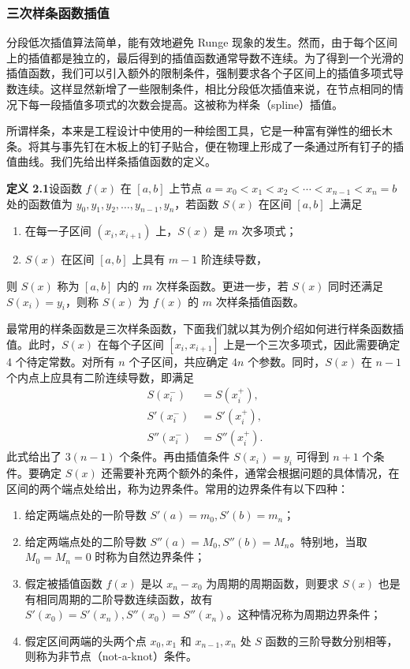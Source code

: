 \subsubsection{三次样条函数插值}

分段低次插值算法简单，能有效地避免 Runge 现象的发生。然而，由于每个区间上的插值都是独立的，最后得到的插值函数通常导数不连续。为了得到一个光滑的插值函数，我们可以引入额外的限制条件，强制要求各个子区间上的插值多项式导数连续。这样显然新增了一些限制条件，相比分段低次插值来说，在节点相同的情况下每一段插值多项式的次数会提高。这被称为样条（spline）插值。

所谓样条，本来是工程设计中使用的一种绘图工具，它是一种富有弹性的细长木条。将其与事先钉在木板上的钉子贴合，便在物理上形成了一条通过所有钉子的插值曲线。我们先给出样条插值函数的定义。

\textbf{定义 2.1}\quad 设函数 $f(x)$ 在 $[a,b]$ 上节点 $a=x_0<x_1<x_2<\cdots<x_{n-1}<x_n=b$ 处的函数值为 $y_0,y_1,y_2,\ldots,y_{n-1},y_n$，若函数 $S(x)$ 在区间 $[a,b]$ 上满足
\begin{enumerate}
\item 在每一子区间 $(x_i,x_{i+1})$ 上，$S(x)$ 是 $m$ 次多项式；
\item $S(x)$ 在区间 $[a,b]$ 上具有 $m-1$ 阶连续导数，
\end{enumerate}
则 $S(x)$ 称为 $[a,b]$ 内的 $m$ 次样条函数。更进一步，若 $S(x)$ 同时还满足 $S(x_i)=y_i$，则称 $S(x)$ 为 $f(x)$ 的 $m$ 次样条插值函数。

最常用的样条函数是三次样条函数，下面我们就以其为例介绍如何进行样条函数插值。此时，$S(x)$ 在每个子区间 $[x_i,x_{i+1}]$ 上是一个三次多项式，因此需要确定 4 个待定常数。对所有 $n$ 个子区间，共应确定 $4n$ 个参数。同时，$S(x)$ 在 $n-1$ 个内点上应具有二阶连续导数，即满足
\begin{equation}
\begin{aligned}
S(x_i^-)&=S(x_i^+),\\
S'(x_i^-)&=S'(x_i^+),\\
S''(x_i^-)&=S''(x_i^+).
\end{aligned}
\tag{2.1.19}
\end{equation}
此式给出了 $3(n-1)$ 个条件。再由插值条件 $S(x_i)=y_i$ 可得到 $n+1$ 个条件。要确定 $S(x)$ 还需要补充两个额外的条件，通常会根据问题的具体情况，在区间的两个端点处给出，称为边界条件。常用的边界条件有以下四种：
\begin{enumerate}
\item 给定两端点处的一阶导数 $S'(a)=m_0,S'(b)=m_n$；
\item 给定两端点处的二阶导数 $S''(a)=M_0,S''(b)=M_n$。特别地，当取 $M_0=M_n=0$ 时称为自然边界条件；
\item 假定被插值函数 $f(x)$ 是以 $x_n-x_0$ 为周期的周期函数，则要求 $S(x)$ 也是有相同周期的二阶导数连续函数，故有 $S'(x_0)=S'(x_n),S''(x_0)=S''(x_n)$。这种情况称为周期边界条件；
\item 假定区间两端的头两个点 $x_0,x_1$ 和 $x_{n-1},x_n$ 处 $S$ 函数的三阶导数分别相等，则称为非节点（not-a-knot）条件。
\end{enumerate}


